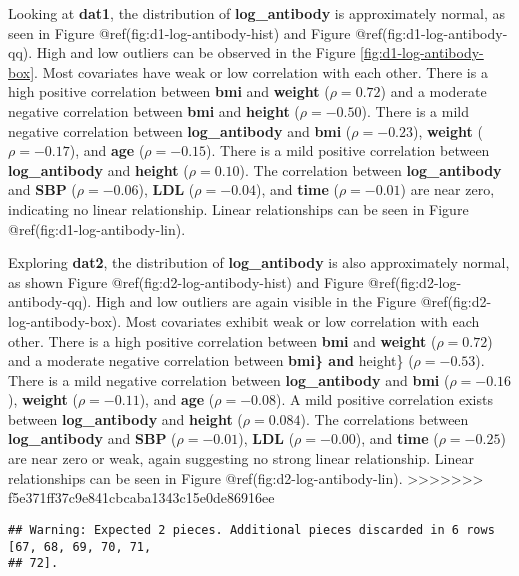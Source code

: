 \documentclass[
]{article}
\begin{document}
Looking at \textbf{dat1}, the distribution of \textbf{log\_antibody} is
approximately normal, as seen in Figure @ref(fig:d1-log-antibody-hist)
and Figure @ref(fig:d1-log-antibody-qq). High and low outliers can be
observed in the Figure \ref{fig:d1-log-antibody-box}. Most covariates
have weak or low correlation with each other. There is a high positive
correlation between \textbf{bmi} and \textbf{weight} (\(\rho = 0.72\))
and a moderate negative correlation between \textbf{bmi} and
\textbf{height} (\(\rho = -0.50\)). There is a mild negative correlation
between \textbf{log\_antibody} and \textbf{bmi} (\(\rho = -0.23\)),
\textbf{weight} (\(\rho = -0.17\)), and \textbf{age} (\(\rho = -0.15\)).
There is a mild positive correlation between \textbf{log\_antibody} and
\textbf{height} (\(\rho = 0.10\)). The correlation between
\textbf{log\_antibody} and \textbf{SBP} (\(\rho = -0.06\)), \textbf{LDL}
(\(\rho = -0.04\)), and \textbf{time} (\(\rho = -0.01\)) are near zero,
indicating no linear relationship. Linear relationships can be seen in
Figure @ref(fig:d1-log-antibody-lin).

Exploring \textbf{dat2}, the distribution of \textbf{log\_antibody} is
also approximately normal, as shown Figure
@ref(fig:d2-log-antibody-hist) and Figure @ref(fig:d2-log-antibody-qq).
High and low outliers are again visible in the Figure
@ref(fig:d2-log-antibody-box). Most covariates exhibit weak or low
correlation with each other. There is a high positive correlation
between \textbf{bmi} and \textbf{weight} (\(\rho = 0.72\)) and a
moderate negative correlation between \textbf{bmi\} and }height\}
(\(\rho = -0.53\)). There is a mild negative correlation between
\textbf{log\_antibody} and \textbf{bmi} (\(\rho = -0.16\)),
\textbf{weight} (\(\rho = -0.11\)), and \textbf{age} (\(\rho = -0.08\)).
A mild positive correlation exists between \textbf{log\_antibody} and
\textbf{height} (\(\rho = 0.084\)). The correlations between
\textbf{log\_antibody} and \textbf{SBP} (\(\rho = -0.01\)), \textbf{LDL}
(\(\rho = -0.00\)), and \textbf{time} (\(\rho = -0.25\)) are near zero
or weak, again suggesting no strong linear relationship. Linear
relationships can be seen in Figure @ref(fig:d2-log-antibody-lin).
\textgreater\textgreater\textgreater\textgreater\textgreater\textgreater\textgreater{}
f5e371ff37c9e841cbcaba1343c15e0de86916ee

\begin{verbatim}
## Warning: Expected 2 pieces. Additional pieces discarded in 6 rows [67, 68, 69, 70, 71,
## 72].
\end{verbatim}
\end{document}
